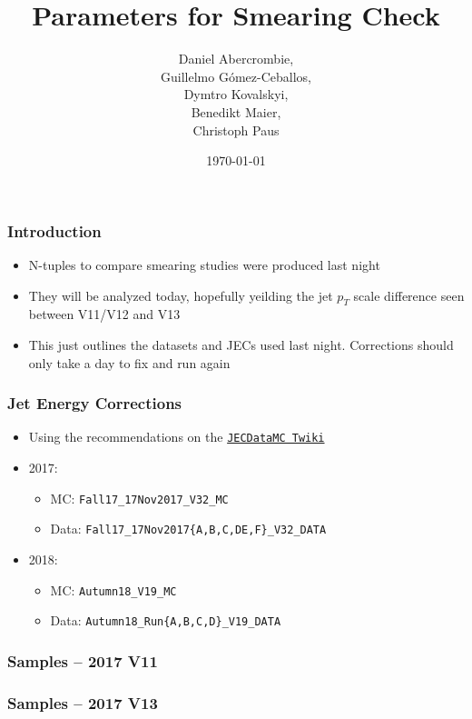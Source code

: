 \documentclass{beamer}
\author[D. Abercrombie]{
  Daniel Abercrombie, \\
  Guillelmo G\'omez-Ceballos, \\
  Dymtro Kovalskyi, \\
  Benedikt Maier, \\
  Christoph Paus
}
\title{\bf \sffamily Parameters for Smearing Check}
\date{\today}
\begin{document}
\begin{frame}
  \titlepage
\end{frame}


\begin{frame}
  \frametitle{Introduction}

  \begin{itemize}
  \item N-tuples to compare smearing studies were produced last night
  \item They will be analyzed today, hopefully yeilding the jet $p_T$ scale difference seen between V11/V12 and V13
  \item This just outlines the datasets and JECs used last night.
    Corrections should only take a day to fix and run again    
  \end{itemize}

\end{frame}


\begin{frame}
  \frametitle{Jet Energy Corrections}

  \begin{itemize}
  \item Using the recommendations on the \href{https://twiki.cern.ch/twiki/bin/viewauth/CMS/JECDataMC}{\texttt{JECDataMC Twiki}}
  \item 2017:
    \begin{itemize}
    \item MC: \texttt{Fall17\_17Nov2017\_V32\_MC}
    \item Data: \texttt{Fall17\_17Nov2017\{A,B,C,DE,F\}\_V32\_DATA}
    \end{itemize}
  \item 2018:
    \begin{itemize}
    \item MC: \texttt{Autumn18\_V19\_MC}
    \item Data: \texttt{Autumn18\_Run\{A,B,C,D\}\_V19\_DATA}
    \end{itemize}
  \end{itemize}

\end{frame}


\begin{frame}
  \frametitle{Samples -- 2017 V11}

  
    
\end{frame}

\begin{frame}
  \frametitle{Samples -- 2017 V13}

  
    
\end{frame}
\end{document}
